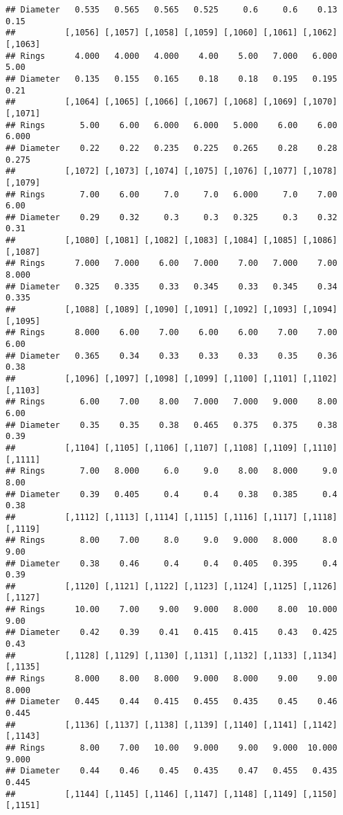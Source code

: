 \documentclass[
]{article}
\begin{document}
\begin{verbatim}
## Diameter   0.535   0.565   0.565   0.525     0.6     0.6    0.13    0.15
##          [,1056] [,1057] [,1058] [,1059] [,1060] [,1061] [,1062] [,1063]
## Rings      4.000   4.000   4.000    4.00    5.00   7.000   6.000    5.00
## Diameter   0.135   0.155   0.165    0.18    0.18   0.195   0.195    0.21
##          [,1064] [,1065] [,1066] [,1067] [,1068] [,1069] [,1070] [,1071]
## Rings       5.00    6.00   6.000   6.000   5.000    6.00    6.00   6.000
## Diameter    0.22    0.22   0.235   0.225   0.265    0.28    0.28   0.275
##          [,1072] [,1073] [,1074] [,1075] [,1076] [,1077] [,1078] [,1079]
## Rings       7.00    6.00     7.0     7.0   6.000     7.0    7.00    6.00
## Diameter    0.29    0.32     0.3     0.3   0.325     0.3    0.32    0.31
##          [,1080] [,1081] [,1082] [,1083] [,1084] [,1085] [,1086] [,1087]
## Rings      7.000   7.000    6.00   7.000    7.00   7.000    7.00   8.000
## Diameter   0.325   0.335    0.33   0.345    0.33   0.345    0.34   0.335
##          [,1088] [,1089] [,1090] [,1091] [,1092] [,1093] [,1094] [,1095]
## Rings      8.000    6.00    7.00    6.00    6.00    7.00    7.00    6.00
## Diameter   0.365    0.34    0.33    0.33    0.33    0.35    0.36    0.38
##          [,1096] [,1097] [,1098] [,1099] [,1100] [,1101] [,1102] [,1103]
## Rings       6.00    7.00    8.00   7.000   7.000   9.000    8.00    6.00
## Diameter    0.35    0.35    0.38   0.465   0.375   0.375    0.38    0.39
##          [,1104] [,1105] [,1106] [,1107] [,1108] [,1109] [,1110] [,1111]
## Rings       7.00   8.000     6.0     9.0    8.00   8.000     9.0    8.00
## Diameter    0.39   0.405     0.4     0.4    0.38   0.385     0.4    0.38
##          [,1112] [,1113] [,1114] [,1115] [,1116] [,1117] [,1118] [,1119]
## Rings       8.00    7.00     8.0     9.0   9.000   8.000     8.0    9.00
## Diameter    0.38    0.46     0.4     0.4   0.405   0.395     0.4    0.39
##          [,1120] [,1121] [,1122] [,1123] [,1124] [,1125] [,1126] [,1127]
## Rings      10.00    7.00    9.00   9.000   8.000    8.00  10.000    9.00
## Diameter    0.42    0.39    0.41   0.415   0.415    0.43   0.425    0.43
##          [,1128] [,1129] [,1130] [,1131] [,1132] [,1133] [,1134] [,1135]
## Rings      8.000    8.00   8.000   9.000   8.000    9.00    9.00   8.000
## Diameter   0.445    0.44   0.415   0.455   0.435    0.45    0.46   0.445
##          [,1136] [,1137] [,1138] [,1139] [,1140] [,1141] [,1142] [,1143]
## Rings       8.00    7.00   10.00   9.000    9.00   9.000  10.000   9.000
## Diameter    0.44    0.46    0.45   0.435    0.47   0.455   0.435   0.445
##          [,1144] [,1145] [,1146] [,1147] [,1148] [,1149] [,1150] [,1151]

\end{verbatim}
\end{document}
